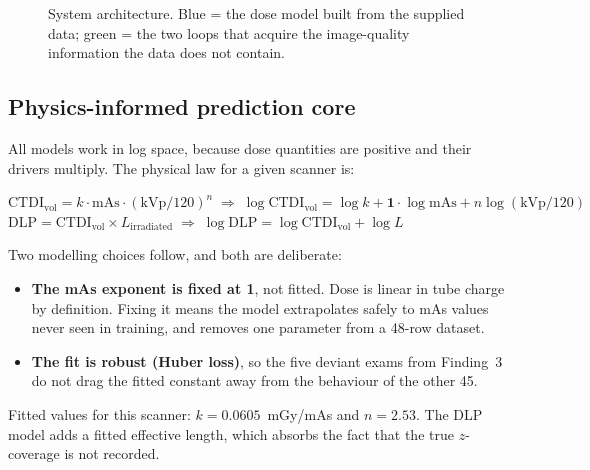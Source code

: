 \documentclass[10pt,a4paper]{article}
\newcommand{\ctdi}{\ensuremath{\mathrm{CTDI}_{\mathrm{vol}}}}
\newcommand{\mgy}{mGy}
\begin{document}
\begin{figure}[h]\centering

\caption{System architecture. Blue = the dose model built from the supplied data; green = the two loops that
acquire the image-quality information the data does not contain.}
\end{figure}

\subsection{Physics-informed prediction core}
All models work in log space, because dose quantities are positive and their drivers multiply. The physical law for
a given scanner is:

\begin{eqbox}
$\displaystyle \ctdi = k \cdot \mathrm{mAs} \cdot (\mathrm{kVp}/120)^{n}
\;\Longrightarrow\; \log \ctdi = \log k + \mathbf{1}\cdot\log \mathrm{mAs} + n\log(\mathrm{kVp}/120)$\\[4pt]
$\displaystyle \mathrm{DLP} = \ctdi \times L_{\text{irradiated}}
\;\Longrightarrow\; \log \mathrm{DLP} = \log \ctdi + \log L$
\end{eqbox}

Two modelling choices follow, and both are deliberate:
\begin{itemize}
\item \textbf{The mAs exponent is fixed at 1}, not fitted. Dose is linear in tube charge by definition. Fixing it
means the model extrapolates safely to mAs values never seen in training, and removes one parameter from a 48-row
dataset.
\item \textbf{The fit is robust (Huber loss)}, so the five deviant exams from Finding~3 do not drag the fitted
constant away from the behaviour of the other 45.
\end{itemize}
Fitted values for this scanner: $k = 0.0605$~\mgy/mAs and $n = 2.53$. The DLP model adds a fitted effective length,
which absorbs the fact that the true $z$-coverage is not recorded.
\end{document}

